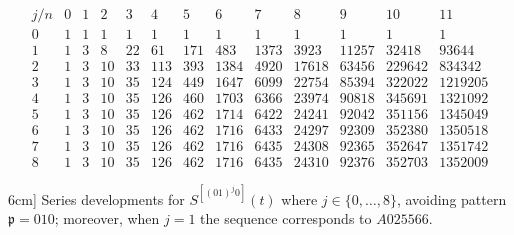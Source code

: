 \begin{table}
\begin{equation*}
\begin{array}{c|cccccccccccc}
    j/n & 0 & 1 & 2 & 3 & 4 & 5 & 6 & 7 & 8 & 9 & 10 & 11\\\hline0 & 1 & 1 & 1 & 1 & 1 & 1 & 1 & 1 & 1 & 1 & 1 & 1\\1 & 1 & 3 & 8 & 22 & 61 & 171 & 483 & 1373 & 3923 & 11257 & 32418 & 93644\\2 & 1 & 3 & 10 & 33 & 113 & 393 & 1384 & 4920 & 17618 & 63456 & 229642 & 834342\\3 & 1 & 3 & 10 & 35 & 124 & 449 & 1647 & 6099 & 22754 & 85394 & 322022 & 1219205\\4 & 1 & 3 & 10 & 35 & 126 & 460 & 1703 & 6366 & 23974 & 90818 & 345691 & 1321092\\5 & 1 & 3 & 10 & 35 & 126 & 462 & 1714 & 6422 & 24241 & 92042 & 351156 & 1345049\\6 & 1 & 3 & 10 & 35 & 126 & 462 & 1716 & 6433 & 24297 & 92309 & 352380 & 1350518\\7 & 1 & 3 & 10 & 35 & 126 & 462 & 1716 & 6435 & 24308 & 92365 & 352647 & 1351742\\8 & 1 & 3 & 10 & 35 & 126 & 462 & 1716 & 6435 & 24310 & 92376 & 352703 & 1352009
\end{array}
\end{equation*}
\caption[Series developments for $S^{[(01)^{j}0]}(t)$ where $j\in \lbrace 0,\ldots,8 \rbrace$.]
        [6cm]{
            Series developments for $S^{[(01)^{j}0]}(t)$  where $j\in \lbrace 0,\ldots,8 \rbrace$,
            avoiding pattern $\mathfrak{p}=010$; moreover,
            when $j=1$ the sequence corresponds to $A025566$.
        }
\label{tbl:S01_j:0}
\end{table}

